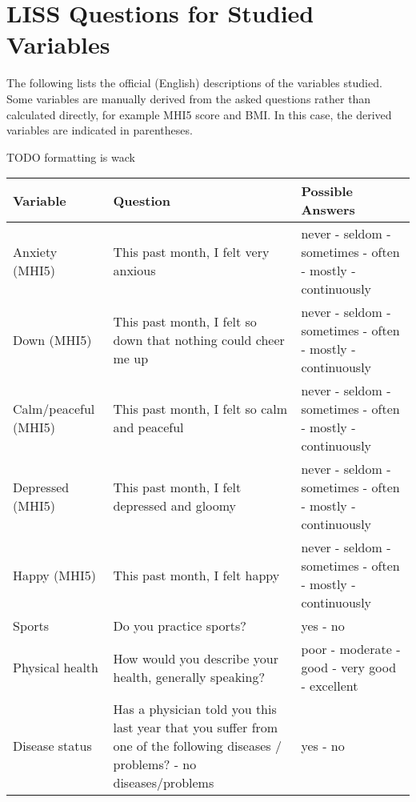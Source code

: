 \chapter{LISS Questions for Studied Variables}
\label{chap:app:liss_questions}
The following lists the official (English) descriptions of the variables studied.
Some variables are manually derived from the asked questions rather than calculated directly, for example MHI5 score and BMI.
In this case, the derived variables are indicated in parentheses.

TODO formatting is wack

\begin{table}[htbp]
\scriptsize
\begin{tabularx}{\textwidth}{l|X|X}
\textbf{Variable} & \textbf{Question} & \textbf{Possible Answers} \\
\hline
Anxiety (MHI5) & This past month, I felt very anxious & never - seldom - sometimes - often - mostly - continuously \\
Down (MHI5) & This past month, I felt so down that nothing could cheer me up & never - seldom - sometimes - often - mostly - continuously \\
Calm/peaceful (MHI5) & This past month, I felt so calm and peaceful & never - seldom - sometimes - often - mostly - continuously \\
Depressed (MHI5) & This past month, I felt depressed and gloomy & never - seldom - sometimes - often - mostly - continuously \\
Happy (MHI5) & This past month, I felt happy & never - seldom - sometimes - often - mostly - continuously \\

Sports & Do you practice sports? & yes - no \\

Physical health & How would you describe your health, generally speaking? & poor - moderate - good - very good - excellent \\
Disease status & Has a physician told you this last year that you suffer from one of the following diseases / problems? - no diseases/problems & yes - no \\


\end{tabularx}
\end{table}

